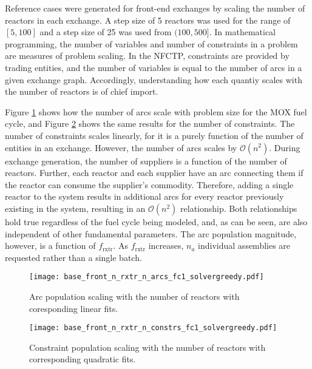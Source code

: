 Reference cases were generated for front-end exchanges by scaling the number of
reactors in each exchange. A step size of 5 reactors was used for the range of
$[5, 100]$ and a step size of 25 was used from $(100, 500]$. In mathematical
  programming, the number of variables and number of constraints in a problem
  are measures of problem scaling. In the NFCTP, constraints are provided by
  trading entities, and the number of variables is equal to the number of arcs
  in a given exchange graph. Accordingly, understanding how each quantiy scales
  with the number of reactors is of chief import.

Figure \ref{fig:base_front_n_rxtr_n_arcs_fc1_solvergreedy} shows how the number
of arcs scale with problem size for the MOX fuel cycle, and Figure
\ref{fig:base_front_n_rxtr_n_constrs_fc1_solvergreedy} shows the same results
for the number of constraints. The number of constraints scales linearly, for it
is a purely function of the number of entities in an exchange. However, the
number of arcs scales by $\mathcal{O}(n^2)$. During exchange generation, the
number of suppliers is a function of the number of reactors. Further, each
reactor and each supplier have an arc connecting them if the reactor can consume
the supplier's commodity. Therefore, adding a single reactor to the system
results in additional arcs for every reactor previously existing in the system,
resulting in an $\mathcal{O}(n^2)$ relationship. Both relationships hold true
regardless of the fuel cycle being modeled, and, as can be seen, are also
independent of other fundamental parameters. The arc population magnitude,
however, is a function of $f_\text{rxtr}$. As $f_\text{rxtr}$ increases, $n_a$
individual assemblies are requested rather than a single batch.

\begin{figure}[h!]
  \begin{center}
    \texttt{[image: base\_front\_n\_rxtr\_n\_arcs\_fc1\_solvergreedy.pdf]}
    \caption[]{
      \label{fig:base_front_n_rxtr_n_arcs_fc1_solvergreedy}
      Arc population scaling with the number of reactors with coresponding linear fits.}
  \end{center}
\end{figure}

\begin{figure}[h!]
  \begin{center}
    \texttt{[image: base\_front\_n\_rxtr\_n\_constrs\_fc1\_solvergreedy.pdf]}
    \caption[]{
      \label{fig:base_front_n_rxtr_n_constrs_fc1_solvergreedy}
      Constraint population scaling with the number of reactors with
      corresponding quadratic fits.}
  \end{center}
\end{figure}


